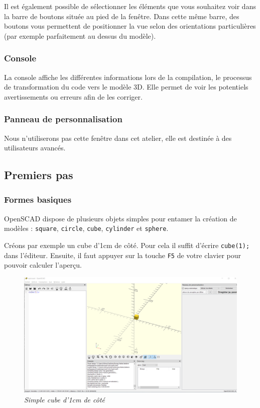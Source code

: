 Il est également possible de sélectionner les éléments que vous souhaitez voir dans la barre de boutons située au pied de la fenêtre.
Dans cette même barre, des boutons vous permettent de positionner la vue selon des orientations particulières (par exemple parfaitement au dessus du modèle).


\subsubsection{Console}

La console affiche les différentes informations lors de la compilation, le processus de transformation du code vers le modèle 3D.
Elle permet de voir les potentiels avertissements ou erreurs afin de les corriger.


\subsubsection{Panneau de personnalisation}

Nous n'utiliserons pas cette fenêtre dans cet atelier, elle est destinée à des utilisateurs avancés.


\subsection{Premiers pas}

\subsubsection{Formes basiques}

OpenSCAD dispose de plusieurs objets simples pour entamer la création de modèles : 
\verb|square|, \verb|circle|, \verb|cube|, \verb|cylinder| et \verb|sphere|.

Créons par exemple un cube d'1cm de côté. Pour cela il suffit d'écrire \verb|cube(1);| dans l'éditeur.
Ensuite, il faut appuyer sur la touche \verb|F5| de votre clavier pour pouvoir calculer l'aperçu.

\begin{figure}[ht]
	\centering
	\includegraphics[width=12cm]{images/cube_1}
	\caption{\textit{Simple cube d'1cm de côté}}
\end{figure}

